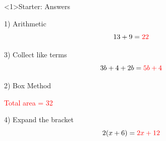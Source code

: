 \documentclass{beamer}
\begin{document}
\begin{frame}<1>{Starter: Answers}
\begin{minipage}[t]{0.48\textwidth}

\begin{block}{1) Arithmetic}
\Large
\[
13 + 9 = \textcolor{red}{22}
\]
\end{block}

\vspace{6.2em}

\begin{block}{3) Collect like terms}
\Large
\[
3b + 4 + 2b = \textcolor{red}{5b + 4}
\]
\end{block}

\end{minipage}\hfill
\begin{minipage}[t]{0.48\textwidth}

\begin{block}{2) Box Method}
\centering
{}

\vspace{0.4em}
\textcolor{red}{Total area = 32}

\end{block}

\vspace{0.6em}

\begin{block}{4) Expand the bracket}
\Large
\[
2(x+6) = \textcolor{red}{2x + 12}
\]
\end{block}

\end{minipage}
\end{frame}
\end{document}
